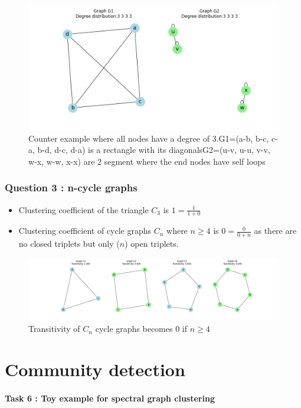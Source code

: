 \documentclass[a4paper]{article}
\begin{document}
\begin{figure}[ht]
    \centering
    \includegraphics[width=.6\textwidth]{figures/graph_compare_quad.png}
    \caption{Counter example where all nodes have a degree of 3.G1=(a-b, b-c, c-a, b-d, d-c, d-a) is a rectangle with its diagonalsG2=(u-v, u-u, v-v, w-x, w-w, x-x) are 2 segment where the end nodes have self loops}
    \label{fig:graph_compare_quad}
\end{figure}

\pagebreak
\section{Question 3 : n-cycle graphs}
\begin{itemize}
    \item Clustering coefficient of the triangle $C_3$ is $1=\frac{1}{1+0}$
    \item Clustering coefficient of cycle graphs $C_n$ where $n \geq 4$ is $0=\frac{0}{0+n}$
    as there are no closed triplets but only ($n$) open triplets. 
\end{itemize}
\begin{figure}[ht]
        \centering
        \includegraphics[width=.6\textwidth]{figures/cycle_graphs.png}
        \caption{Transitivity of $C_n$ cycle graphs becomes 0 if $n \geq 4$}
        \label{fig:cycle_graphs}
\end{figure}




\pagebreak

\part[short]{Community detection}

\subsection*{Task 6 : Toy example for spectral graph clustering}
\end{document}

